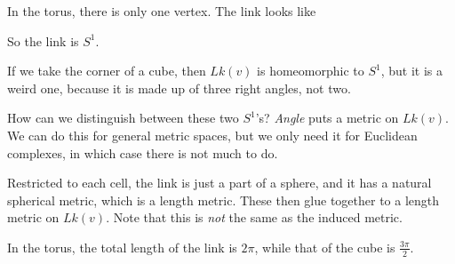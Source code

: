 \documentclass[a4paper]{article}
\begin{document}
\begin{eg}
  In the torus, there is only one vertex. The link looks like
  \begin{center}
  \end{center}
  So the link is $S^1$.
\end{eg}

\begin{eg}
  If we take the corner of a cube, then $Lk(v)$ is homeomorphic to $S^1$, but it is a weird one, because it is made up of three right angles, not two.
  \begin{center}
  \end{center}
\end{eg}

How can we distinguish between these two $S^1$'s? \emph{Angle} puts a metric on $Lk(v)$. We can do this for general metric spaces, but we only need it for Euclidean complexes, in which case there is not much to do.

Restricted to each cell, the link is just a part of a sphere, and it has a natural spherical metric, which is a length metric. These then glue together to a length metric on $Lk(v)$. Note that this is \emph{not} the same as the induced metric.

\begin{eg}
  In the torus, the total length of the link is $2\pi$, while that of the cube is $\frac{3\pi}{2}$.
\end{eg}
\end{document}
